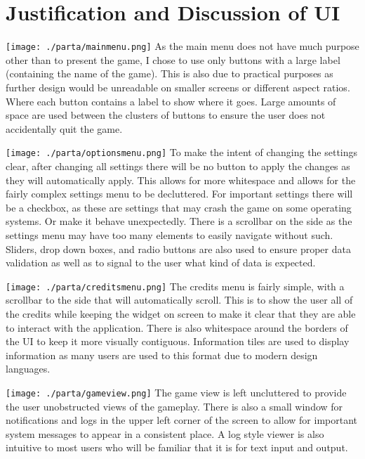 \documentclass[12pt, DIV=calc]{scrartcl}
\begin{document}
\clearpage
\section{Justification and Discussion of UI}

\texttt{[image: ./parta/mainmenu.png]}
As the main menu does not have much purpose other than to present the game, I chose to use only buttons with a large label (containing the name of the game). This is also due to practical purposes as further design would be unreadable on smaller screens or different aspect ratios. Where each button contains a label to show where it goes. Large amounts of space are used between the clusters of buttons to ensure the user does not accidentally quit the game.

\texttt{[image: ./parta/optionsmenu.png]}
To make the intent of changing the settings clear, after changing all settings there will be no button to apply the changes as they will automatically apply. This allows for more whitespace and allows for the fairly complex settings menu to be decluttered. For important settings there will be a checkbox, as these are settings that may crash the game on some operating systems. Or make it behave unexpectedly. There is a scrollbar on the side as the settings menu may have too many elements to easily navigate without such. Sliders, drop down boxes, and radio buttons are also used to ensure proper data validation as well as to signal to the user what kind of data is expected.


\texttt{[image: ./parta/creditsmenu.png]}
The credits menu is fairly simple, with a scrollbar to the side that will automatically scroll. This is to show the user all of the credits while keeping the widget on screen to make it clear that they are able to interact with the application. There is also whitespace around the borders of the UI to keep it more visually contiguous. Information tiles are used to display information as many users are used to this format due to modern design languages.

\texttt{[image: ./parta/gameview.png]}
The game view is left uncluttered to provide the user unobstructed views of the gameplay. There is also a small window for notifications and logs in the upper left corner of the screen to allow for important system messages to appear in a consistent place. A log style viewer is also intuitive to most users who will be familiar that it is for text input and output.
\end{document}

